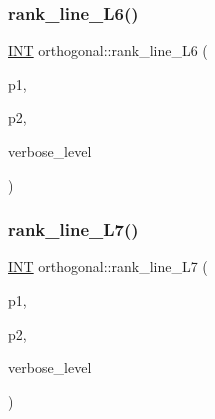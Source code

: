 \mbox{\label{classorthogonal_aa32bfc8e78ece724ecbc703e94288a14}} 
\subsubsection{\texorpdfstring{rank\+\_\+line\+\_\+\+L6()}{rank\_line\_L6()}}
{\footnotesize\ttfamily \mbox{\hyperlink{galois_8h_a09fddde158a3a20bd2dcadb609de11dc}{I\+NT}} orthogonal\+::rank\+\_\+line\+\_\+\+L6 (\begin{DoxyParamCaption}\item[{\mbox{\hyperlink{galois_8h_a09fddde158a3a20bd2dcadb609de11dc}{I\+NT}}}]{p1,  }\item[{\mbox{\hyperlink{galois_8h_a09fddde158a3a20bd2dcadb609de11dc}{I\+NT}}}]{p2,  }\item[{\mbox{\hyperlink{galois_8h_a09fddde158a3a20bd2dcadb609de11dc}{I\+NT}}}]{verbose\+\_\+level }\end{DoxyParamCaption})}

\mbox{\label{classorthogonal_aea60e6f3746fe39f8d321bc51f67fa3e}} 
\subsubsection{\texorpdfstring{rank\+\_\+line\+\_\+\+L7()}{rank\_line\_L7()}}
{\footnotesize\ttfamily \mbox{\hyperlink{galois_8h_a09fddde158a3a20bd2dcadb609de11dc}{I\+NT}} orthogonal\+::rank\+\_\+line\+\_\+\+L7 (\begin{DoxyParamCaption}\item[{\mbox{\hyperlink{galois_8h_a09fddde158a3a20bd2dcadb609de11dc}{I\+NT}}}]{p1,  }\item[{\mbox{\hyperlink{galois_8h_a09fddde158a3a20bd2dcadb609de11dc}{I\+NT}}}]{p2,  }\item[{\mbox{\hyperlink{galois_8h_a09fddde158a3a20bd2dcadb609de11dc}{I\+NT}}}]{verbose\+\_\+level }\end{DoxyParamCaption})}

\mbox{\label{classorthogonal_a5c9c6d1aaeae12876c1d52a109ffdb0f}} 
